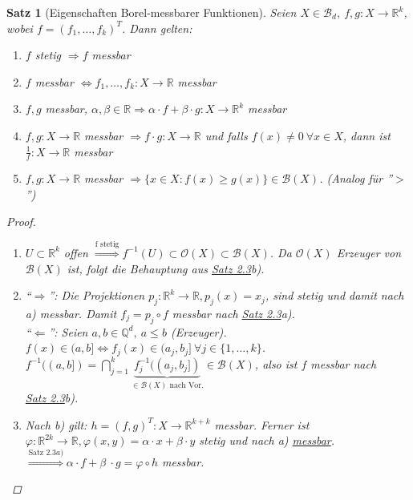 \documentclass[a4paper]{report}
\newcommand{\R}{\mathbb{R}}
\newcommand{\Q}{\mathbb{Q}}
\newcommand{\Borel}{\mathcal{B}}
\newcommand{\Bd}{\Borel_d}
\newcommand{\jlabel}[1]{\label{j_#1}}
\newcommand{\jshortlink}[1]{\jhyperref{#1}{\text{#1}}}
\newcommand{\jhyperref}[2]{\hyperref[j_#1]{#2}}
\newcommand{\jlink}[1]{\jhyperref{#1}{#1}}
\newcommand{\jabb}[3]{ #1: #2 \rightarrow #3 }
\theoremstyle{plain}
\newtheorem{satz}[thm]{Satz}
\theoremstyle{definition}
\begin{document}
{{{\begin{satz}[Eigenschaften Borel-messbarer Funktionen]
\jlabel{Satz 2.5}
    Seien $X\in \Bd, \ \jabb{f,g}{X}{\R^k}$, wobei $f = (f_1, \dots, f_k)^T$. Dann gelten:
    \begin{enumerate}
        \item $f$ stetig $\Rightarrow f$ messbar
        \item $f$ messbar $\Leftrightarrow \jabb{f_1,\dots, f_k}{X}{\R}$ messbar
        \item $f,g$ messbar, $\alpha, \beta \in \R \Rightarrow \jabb{\alpha \cdot f + \beta \cdot g}{X}{\R^k}$ messbar
        \item $\jabb{f,g}{X}{\R}$ messbar $\Rightarrow \jabb{f\cdot g}{X}{\R}$ und falls $f(x)\ne 0 \ \forall x\in X$, dann ist $\jabb{\frac{1}{f}}{X}{\R}$ messbar
        \item $\jabb{f,g}{X}{\R}$ messbar $\Rightarrow \{x\in X: f(x) \ge g(x)\} \in \Borel(X)$. (Analog für ''$>$'')
    \end{enumerate}
    \begin{proof}
        \begin{enumerate}
            \item 
                $U \subset \R^k$ offen $\overset{\text{f stetig}}{\Rightarrow} f^{-1}(U) \subset \mathcal{O}(X) \subset \Borel(X)$. Da $\mathcal{O}(X)$ Erzeuger von $\Borel(X)$ ist, folgt die Behauptung aus \jlink{Satz 2.3}b).
            
            \item 
                ``$\Rightarrow$'': Die Projektionen $\jabb{p_j}{\R^k}{\R}, p_j(x) = x_j$, sind stetig und damit nach a) messbar. Damit $f_j = p_j \circ f$ messbar nach \jlink{Satz 2.3}a).\\
                ``$\Leftarrow$'': Seien $a,b\in \Q^d,\ a\le b$ (Erzeuger).\\
                $f(x) \in (a,b] \Leftrightarrow f_j(x)\in(a_j,b_j] \ \forall j\in \{1,\dots,k\}$.\\
                $f^{-1}((a,b]) = \bigcap_{j=1}^k \underbrace{f_j^{-1}((a_j,b_j])}_{\in \Borel(X) \text{ nach Vor.}} \in \Borel(X)$, also ist $f$ messbar nach \\
                \jlink{Satz 2.3}b).
            
            \item 
                Nach b) gilt: $\jabb{h=(f, g)^T}{X}{\R^{k+k}}$ messbar. Ferner ist $\jabb{\varphi}{\R^{2k}}{\R}, \varphi(x,y) = \alpha\cdot x + \beta\cdot y$ stetig und nach a) \jlink{messbar}.\\
                $\overset{\jshortlink{Satz 2.3}a)}{\Rightarrow} \alpha\cdot f + \beta\ \cdot g = \varphi \circ h$ messbar.
            

\end{enumerate}
\end{proof}
\end{satz}}}}
\end{document}
